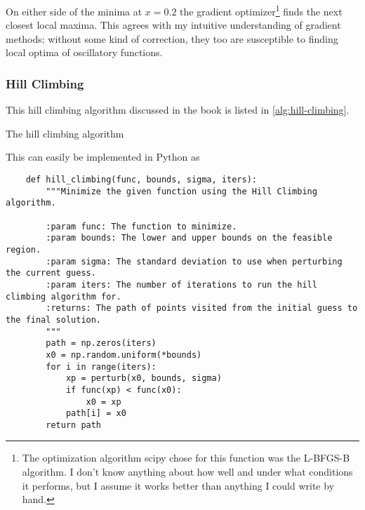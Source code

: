 \documentclass{article}
\begin{document}
On either side of the minima at $x = 0.2$ the gradient optimizer\footnote{The optimization
    algorithm scipy chose for this function was the L-BFGS-B algorithm. I don't know anything about
    how well and under what conditions it performs, but I assume it works better than anything I
    could write by hand.} finds the next closest local maxima. This agrees with my intuitive
understanding of gradient methods; without some kind of correction, they too are susceptible to
finding local optima of oscillatory functions.

\subsubsection{Hill Climbing}

This hill climbing algorithm discussed in the book is listed in \autoref{alg:hill-climbing}.

\begin{algorithm}[h]
    \begin{algorithmic}
                \EndIf{}
            \EndWhile{}
            \State{}
        \EndFunction{}
    \end{algorithmic}
    \caption{The hill climbing algorithm}\label{alg:hill-climbing}
\end{algorithm}

This can easily be implemented in Python as

\begin{verbatim}
    def hill_climbing(func, bounds, sigma, iters):
        """Minimize the given function using the Hill Climbing algorithm.

        :param func: The function to minimize.
        :param bounds: The lower and upper bounds on the feasible region.
        :param sigma: The standard deviation to use when perturbing the current guess.
        :param iters: The number of iterations to run the hill climbing algorithm for.
        :returns: The path of points visited from the initial guess to the final solution.
        """
        path = np.zeros(iters)
        x0 = np.random.uniform(*bounds)
        for i in range(iters):
            xp = perturb(x0, bounds, sigma)
            if func(xp) < func(x0):
                x0 = xp
            path[i] = x0
        return path
\end{verbatim}
\end{document}
